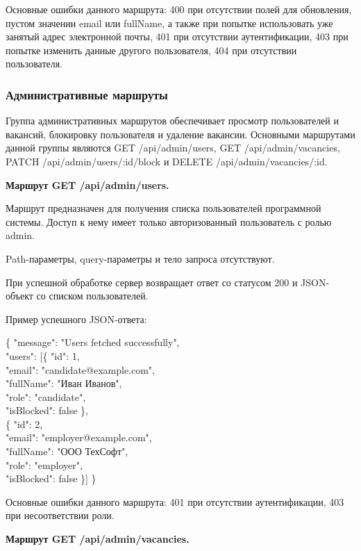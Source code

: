 Основные ошибки данного маршрута: 400 при отсутствии полей для обновления, пустом значении email или fullName, а также при попытке использовать уже занятый адрес электронной почты, 401 при отсутствии аутентификации, 403 при попытке изменить данные другого пользователя, 404 при отсутствии пользователя.

\subsubsection{Административные маршруты}

Группа административных маршрутов обеспечивает просмотр пользователей и вакансий, блокировку пользователя и удаление вакансии. Основными маршрутами данной группы являются GET /api/admin/users, GET /api/admin/vacancies, PATCH /api/admin/users/:id/block и DELETE /api/admin/vacancies/:id.

\textbf{Маршрут GET /api/admin/users.}

Маршрут предназначен для получения списка пользователей программной системы. Доступ к нему имеет только авторизованный пользователь с ролью admin.

Path-параметры, query-параметры и тело запроса отсутствуют.

При успешной обработке сервер возвращает ответ со статусом 200 и JSON-объект со списком пользователей.

Пример успешного JSON-ответа:

\begin{flushleft}
	\small\ttfamily
	\{ "message": "Users fetched successfully",\\
	"users": [\{ "id": 1,\\
	"email": "candidate@example.com",\\
	"fullName": "Иван Иванов",\\
	"role": "candidate",\\
	"isBlocked": false \},\\
	\{ "id": 2,\\
	"email": "employer@example.com",\\
	"fullName": "ООО ТехСофт",\\
	"role": "employer",\\
	"isBlocked": false \}] \}
\end{flushleft}

Основные ошибки данного маршрута: 401 при отсутствии аутентификации, 403 при несоответствии роли.

\textbf{Маршрут GET /api/admin/vacancies.}

